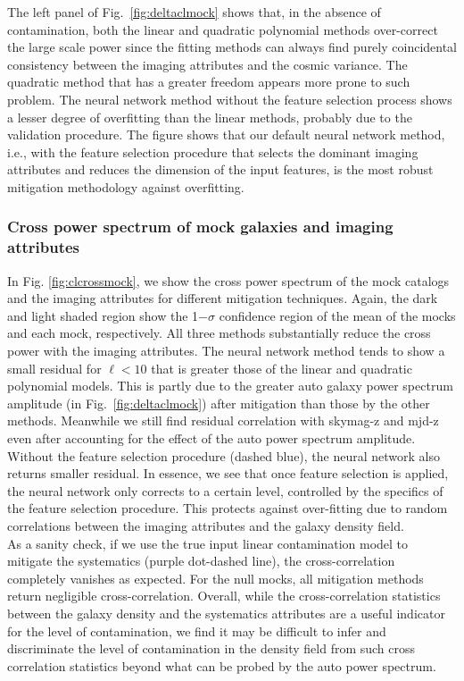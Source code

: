 \documentclass[fleqn, usenatbib]{mnras}
\begin{document}
The left panel of Fig.~\ref{fig:deltaclmock} shows that, in the absence of contamination, both the linear and quadratic polynomial methods over-correct the large scale power since the fitting methods can always find purely coincidental consistency between the imaging attributes and the cosmic variance. The quadratic method that has a greater freedom appears more prone to such problem. The neural network method without the feature selection process shows a lesser degree of overfitting than the linear methods, probably due to the validation procedure. The figure shows that our default neural network method, i.e., with the feature selection procedure that selects the dominant imaging attributes and reduces the dimension of the input features, is the most robust mitigation methodology against overfitting.


\subsubsection{Cross power spectrum of mock galaxies and imaging attributes}
In Fig. \ref{fig:clcrossmock}, we show the cross power spectrum of the mock catalogs and the imaging attributes for different mitigation techniques. Again, the dark and light shaded region show the 1$-\sigma$ confidence region of the mean of the mocks and each mock, respectively. All three methods substantially reduce the cross power with the imaging attributes. The neural network method tends to show a small residual for $\ell <10$ that is greater those of the linear and quadratic polynomial models. This is partly due to the greater auto galaxy power spectrum amplitude (in Fig.~\ref{fig:deltaclmock}) after mitigation than those by the other methods. Meanwhile we still find residual correlation with skymag-z and mjd-z even after accounting for the effect of the auto power spectrum amplitude. Without the feature selection procedure (dashed blue), the neural network also returns smaller residual. In essence, we see that once feature selection is applied, the neural network only corrects to a certain level, controlled by the specifics of the feature selection procedure. This protects against over-fitting due to random correlations between the imaging attributes and the galaxy density field.\\ 

As a sanity check, if we use the true input linear contamination model to mitigate the systematics (purple dot-dashed line), the cross-correlation completely vanishes as expected. For the null mocks, all mitigation methods return negligible cross-correlation. Overall, while the cross-correlation statistics between the galaxy density and the systematics attributes are a useful indicator for the level of contamination, we find it may be difficult to infer and discriminate the level of contamination in the density field from such cross correlation statistics beyond what can be probed by the auto power spectrum.
\end{document}
